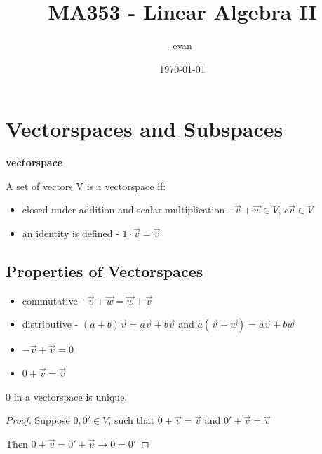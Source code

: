 \documentclass[11pt]{article}
\author{evan}
\date{\today}
\title{MA353 - Linear Algebra II}
\begin{document}
\maketitle
\tableofcontents


\section{Vectorspaces and Subspaces}
\label{sec:orgheadline3}
\begin{definition}
\textbf{vectorspace}

A set of vectors V is a vectorspace if:

\begin{itemize}
\item closed under addition and scalar multiplication - \(\overrightarrow{v} + \overrightarrow{w} \in V\), \(c \overrightarrow{v} \in V\)
\item an identity is defined - \(1 \cdot \overrightarrow{v} = \overrightarrow{v}\)
\end{itemize}
\end{definition}

\subsection{Properties of Vectorspaces}
\label{sec:orgheadline1}
\begin{itemize}
\item commutative - \(\overrightarrow{v} + \overrightarrow{w} = \overrightarrow{w} + \overrightarrow{v}\)
\item distributive - \((a + b)\overrightarrow{v} = a\overrightarrow{v} + b \overrightarrow{v}\) and \(a(\overrightarrow{v} + \overrightarrow{w}) = a \overrightarrow{v} + b \overrightarrow{w}\)
\item \(- \overrightarrow{v} + \overrightarrow{v} = 0\)
\item \(0 + \overrightarrow{v} = \overrightarrow{v}\)
\end{itemize}

\begin{theorem}
0 in a vectorspace is unique.
\end{theorem}
\begin{proof}
Suppose \(0,0' \in V\), such that \(0 + \overrightarrow{v} = \overrightarrow{v}\) and \(0' + \overrightarrow{v} = \overrightarrow{v}\)

Then \(0 + \overrightarrow{v} = 0' + \overrightarrow{v} \longrightarrow 0 = 0'\)
\end{proof}
\end{document}
